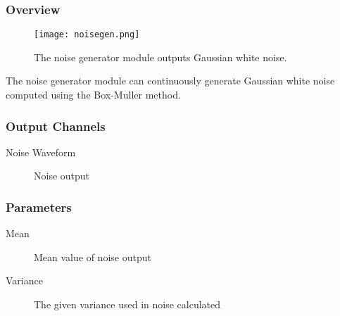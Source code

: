 
\subsubsection{Overview}
\label{Noise Generator}

\begin{figure}[h]
\begin{center}
\texttt{[image: noisegen.png]} 
\caption[Noise Generator]{The noise generator module outputs Gaussian white noise.} 
\end{center}
\label{wavemaker}
\end{figure}

The noise generator module can continuously generate Gaussian white noise computed using the Box-Muller method.

\subsubsection{Output Channels}
\begin{description}
\item [Noise Waveform]Noise output
\end{description}

\subsubsection{Parameters}
\begin{description}
\item [Mean]Mean value of noise output
\item [Variance]The given variance used in noise calculated
\end{description}